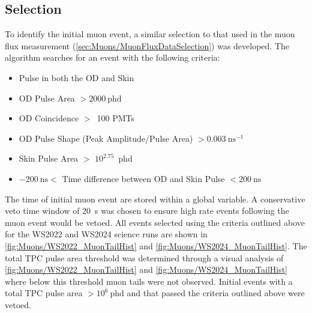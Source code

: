 \subsection{Selection}\label{sec:Muons/MuonVetoCutDesc}
To identify the initial muon event, a similar selection to that used in the muon flux measurement (\autoref{sec:Muons/MuonFluxDataSelection}) was developed. The algorithm searches for an event with the following criteria:
\begin{itemize}
    \item Pulse in both the OD and Skin
    \item OD Pulse Area $>2000~\text{phd}$
    \item OD Coincidence $>$~100 PMTs
    \item OD Pulse Shape (Peak Amplitude/Pulse Area) $>0.003~\text{ns}^{-1}$
    \item Skin Pulse Area $>$ $10^{2.75}$~phd
    \item $-200~\text{ns}<$ Time difference between OD and Skin Pulse $< 200~\text{ns}$
\end{itemize}
The time of initial muon event are stored within a global variable. A conservative veto time window of 20~s was chosen to ensure high rate events following the muon event would be vetoed. All events selected using the criteria outlined above for the WS2022 and WS2024 science runs are shown in \autoref{fig:Muons/WS2022_MuonTailHist} and \autoref{fig:Muons/WS2024_MuonTailHist}. The total TPC pulse area threshold was determined through a visual analysis of \autoref{fig:Muons/WS2022_MuonTailHist} and \autoref{fig:Muons/WS2024_MuonTailHist} where below this threshold muon tails were not observed. Initial events with a total TPC pulse area $>10^{6}~\text{phd}$ and that passed the criteria outlined above were vetoed.

